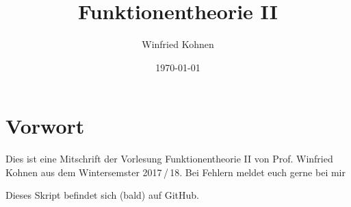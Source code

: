 \documentclass[]{scrbook}
\title{Funktionentheorie II}
\author{Winfried Kohnen}
\date{\today}
\begin{document}
\pagestyle{plain}

\maketitle

\chapter*{Vorwort}

Dies ist eine Mitschrift der Vorlesung Funktionentheorie II von Prof. Winfried Kohnen aus dem Wintersemster 2017\,/\,18.
Bei Fehlern meldet euch gerne bei mir

\begin{center}
\end{center}

Dieses Skript befindet sich (bald) auf GitHub.

\tableofcontents
\clearpage

\setcounter{page}{0}
\pagestyle{fancy}





\end{document}
